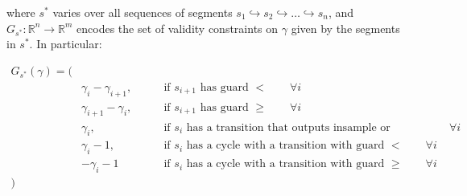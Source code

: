 \documentclass{article}
\newcommand{\R}{\mathbb{R}}
\newcommand{\1}{\langle 1 \rangle}
\newcommand{\2}{\langle 2 \rangle}
\begin{document}
where $s^*$ varies over all sequences of segments $s_1 \hookrightarrow s_2 \hookrightarrow \dots \hookrightarrow s_n$, and $G_{s^*} : \R^n \to \R^m$ encodes the set of validity constraints on $\gamma$ given by the segments in $s^*$. In particular: 

\begin{align*}
    G_{s^*}(\gamma) = 
        ( &\\
        &\gamma_{i} - \gamma_{i + 1},  \qquad &\text{if } s_{i + 1} \text{ has guard } < \qquad \forall i \\
        &\gamma_{i + 1} - \gamma_{i}, \qquad &\text{if } s_{i + 1} \text{ has guard } \geq \qquad \forall i \\[1em]
        &\gamma_i, \qquad &\text{if } s_i \text{ has a transition that outputs insample or insample'}     \qquad \forall i \\[1em]
        &\gamma_i - 1, \qquad &\text{if } s_i \text{ has a cycle with a transition with guard } < \qquad \forall i \\
        &-\gamma_i - 1 \qquad &\text{if } s_i \text{ has a cycle with a transition with guard } \geq \qquad \forall i \\
        ) &
\end{align*}
\end{document}
